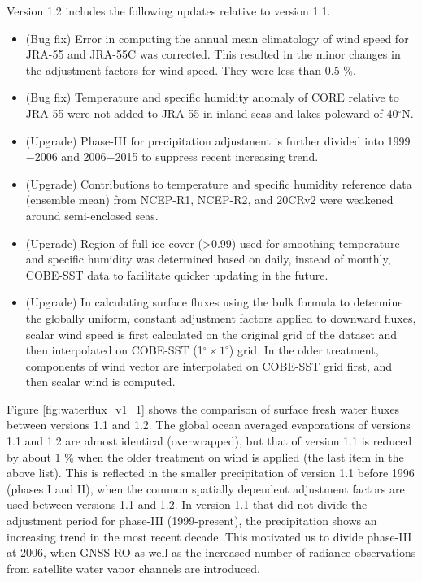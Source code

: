 \documentclass[dvipdfmx]{elsarticle_mod}
\begin{document}
Version 1.2 includes the following updates relative to version 1.1.
\begin{itemize}
\item (Bug fix) Error in computing the annual mean climatology of wind speed for JRA-55 and JRA-55C was corrected. This resulted in the minor changes in the adjustment factors for wind speed. They were less than 0.5 \%.
\item (Bug fix) Temperature and specific humidity anomaly of CORE relative to JRA-55 were not added to JRA-55 in inland seas and lakes poleward of 40$^{\circ}$N.
\item (Upgrade) Phase-III for precipitation adjustment is further divided into 1999$-$2006 and 2006$-$2015 to suppress recent increasing trend.
\item (Upgrade) Contributions to temperature and specific humidity reference data (ensemble mean) from NCEP-R1, NCEP-R2, and 20CRv2 were weakened around semi-enclosed seas.
\item (Upgrade) Region of full ice-cover (>0.99) used for smoothing temperature and specific humidity was determined based on daily, instead of monthly, COBE-SST data to facilitate quicker updating in the future.
\item (Upgrade) In calculating surface fluxes using the bulk formula to determine the globally uniform, constant adjustment factors applied to downward fluxes, scalar wind speed is first calculated on the original grid of the dataset and then interpolated on COBE-SST (1$^{\circ} \times 1^{\circ}$) grid. In the older treatment, components of wind vector are interpolated on COBE-SST grid first, and then scalar wind is computed.
\end{itemize}

Figure \ref{fig:waterflux_v1_1} shows the comparison of surface fresh water fluxes between versions 1.1 and 1.2. The global ocean averaged evaporations of versions 1.1 and 1.2 are almost identical (overwrapped), but that of version 1.1 is reduced by about 1 \% when the older treatment on wind is applied (the last item in the above list). This is reflected in the smaller precipitation of version 1.1 before 1996 (phases I and II), when the common spatially dependent adjustment factors are used between versions 1.1 and 1.2. In version 1.1 that did not divide the adjustment period for phase-III (1999-present), the precipitation shows an increasing trend in the most recent decade. This motivated us to divide phase-III at 2006, when GNSS-RO as well as the increased number of radiance observations from satellite water vapor channels are introduced.
\end{document}
